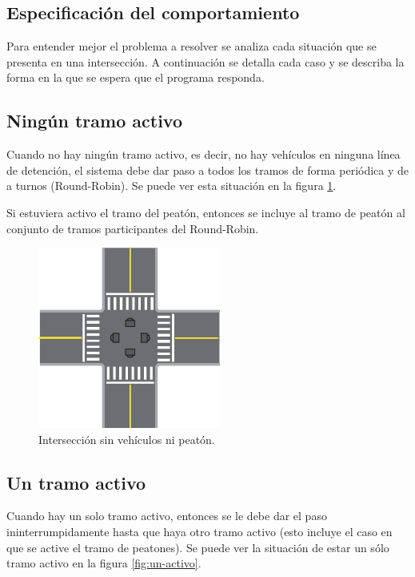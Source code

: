 	\subsection{Especificación del comportamiento}\label{sec:spec}

		Para entender mejor el problema a resolver se analiza cada situación que se presenta en una intersección.
		A continuación se detalla cada caso y se describa la forma en la que se espera que el programa responda.



	\subsection{Ningún tramo activo}

		Cuando no hay ningún tramo activo, es decir, no hay vehículos en ninguna línea de detención, el sistema debe dar paso a todos los tramos de forma periódica y de a turnos (Round-Robin).
		Se puede ver esta situación en la figura \ref{fig:ningun-activo}.

		Si estuviera activo el tramo del peatón, entonces se incluye al tramo de peatón al conjunto de tramos participantes del Round-Robin.

		\begin{figure}[htbp]
			\centering
			\includegraphics[width=6cm]{imagenes/ningun-activo.eps}
			\caption{Intersección sin vehículos ni peatón.}
			\label{fig:ningun-activo}
		\end{figure}



	\subsection{Un tramo activo}

		Cuando hay un solo tramo activo, entonces se le debe dar el paso ininterrumpidamente hasta que haya otro tramo activo (esto incluye el caso en que se active el tramo de peatones).
		Se puede ver la situación de estar un sólo tramo activo en la figura \ref{fig:un-activo}.

